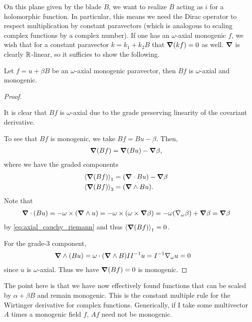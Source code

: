 \documentclass[12pt]{article}
\begin{document}
On this plane given by the blade $B$, we want to realize $B$ acting as $i$ for a holomorphic function. In particular, this means we need the Dirac operator to respect multiplication by constant paravectors (which is analogous to scaling complex functions by a complex number). If one has an $\omega$-axial monogenic $f$, we wish that for a constant paravector $k=k_1 + k_2 B$ that $\grad (kf)=0$ as well. $\grad$ is clearly $\R$-linear, so it sufficies to show the following.

\begin{lemma}
    \label{lem:mult_by_i_monogenic}
    Let $f=u+\beta B$ be an $\omega$-axial monogenic paravector, then $B f$ is $\omega$-axial and monogenic.
\end{lemma}
\begin{proof}~
    
    It is clear that $B f$ is $\omega$-axial due to the grade preserving linearity of the covariant derivative.
    
    To see that $B f$ is monogenic, we take $B  f = B  u - \beta$.  Then,
    \begin{align*}
    \grad (Bf) = \grad (B u) - \grad \beta,
    \end{align*}
    where we have the graded components
    \begin{align*}
        \proj{1}{\grad (B f)} &= (\grad \cdot Bu)  - \grad \beta\\
        \proj{3}{\grad (Bf)} &= (\grad \wedge B u).
    \end{align*}
    Note that
    \begin{align*}
    \grad \cdot (Bu) =  -\omega \times (\grad \wedge u)  =- \omega \times (\omega \times \grad\beta) = -\omega (\nabla_\omega \beta)+\grad \beta = \grad \beta
    \end{align*}
    by \ref{eq:axial_cauchy_riemann} and thus $\proj{1}{\grad (Bf)}=0$. 
    
    For the grade-3 component,
    \begin{align*}
        \grad \wedge (B u) &= \omega \cdot  (\grad \wedge B)II^{-1}u = I^{-1} \nabla_\omega u=0
    \end{align*}
    since $u$ is $\omega$-axial. Thus we have $\grad(B f)=0$ is monogenic.
\end{proof}

The point here is that we have now effectively found functions that can be scaled by $\alpha + \beta B$ and remain monogenic.  This is the constant multiple rule for the Wirtinger derivative for complex functions. Generically, if I take some multivector $A$ times a monogenic field $f$, $Af$ need not be monogenic.
\end{document}
